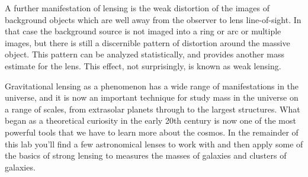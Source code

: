 A further manifestation of lensing is the weak distortion of the
images of background objects which are well away from the observer to
lens line-of-sight. In that case the background source is not imaged
into a ring or arc or multiple images, but there is still a discernible pattern of
distortion around the massive object. This pattern can be
analyzed statistically, and provides another mass estimate for the
lens. This effect, not surprisingly, is known as weak lensing.

Gravitational lensing as a phenomenon has a wide range of
manifestations in the universe, and it is now an important technique
for study mass in the universe on a range of scales, from extrasolar
planets through to the largest structures. What began as a theoretical
curiosity in the early 20th century is now one of the most powerful
tools that we have to learn more about the cosmos. In the remainder of
this lab you'll find a few astronomical lenses to work with and then apply some of
the basics of strong lensing to measures the masses of galaxies and
clusters of galaxies.


